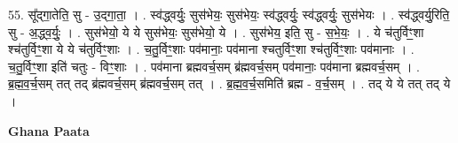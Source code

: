 \documentclass[17pt]{extarticle}
\begin{document}
55. सू᳚द्‍गा॒तेति॒ सु - उ॒द्‍गा॒ता॒ । . स्व॑द्ध्वर्युः॒ सुस॑भेयः॒ सुस॑भेयः॒ स्व॑द्ध्वर्युः॒ स्व॑द्ध्वर्युः॒ सुस॑भेयः । . स्व॑द्ध्वर्यु॒रिति॒ सु - अ॒द्ध्व॒र्युः॒ । . सुस॑भेयो॒ ये ये सुस॑भेयः॒ सुस॑भेयो॒ ये । . सुस॑भेय॒ इति॒ सु - स॒भे॒यः॒ । . ये च॑तुर्विꣳ॒॒शा श्च॑तुर्विꣳ॒॒शा ये ये च॑तुर्विꣳ॒॒शाः । . च॒तु॒र्विꣳ॒॒शाः पव॑मानाः॒ पव॑माना श्चतुर्विꣳ॒॒शा श्च॑तुर्विꣳ॒॒शाः पव॑मानाः । . च॒तु॒र्विꣳ॒॒शा इति॑ चतुः - विꣳ॒॒शाः । . पव॑माना ब्रह्मवर्च॒सम् ब्र॑ह्मवर्च॒सम् पव॑मानाः॒ पव॑माना ब्रह्मवर्च॒सम् । . ब्र॒ह्म॒व॒र्च॒सम् तत् तद् ब्र॑ह्मवर्च॒सम् ब्र॑ह्मवर्च॒सम् तत् । . ब्र॒ह्म॒व॒र्च॒समिति॑ ब्रह्म - व॒र्च॒सम् । . तद् ये ये तत् तद् ये । \newline

\textbf{Ghana Paata } \newline
\end{document}
